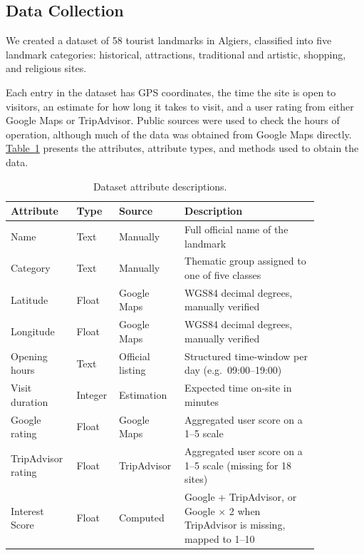 \subsection*{Data Collection}

We created a dataset of 58 tourist landmarks in Algiers, classified into five landmark categories: historical, attractions, traditional and artistic, shopping, and religious sites.

Each entry in the dataset has GPS coordinates, the time the site is open to visitors, an estimate for how long it takes to visit, and a user rating from either Google Maps or TripAdvisor. Public sources were used to check the hours of operation, although much of the data was obtained from Google Maps directly. \hyperref[tab:attributes]{Table~\ref*{tab:attributes}} presents the attributes, attribute types, and methods used to obtain the data.

\begin{table}[htbp]
  \centering
  \caption{Dataset attribute descriptions.}
  \label{tab:attributes}
  \small
  \renewcommand{\arraystretch}{1.15}
  \begin{tabular}{|p{0.18\linewidth}|p{0.10\linewidth}|p{0.17\linewidth}|p{0.41\linewidth}|}
    \hline
    \textbf{Attribute} & \textbf{Type} & \textbf{Source} & \textbf{Description} \\
    \hline
    Name & Text & Manually & Full official name of the landmark \\
    \hline
    Category & Text & Manually & Thematic group assigned to one of five classes \\
    \hline
    Latitude & Float & Google Maps & WGS84 decimal degrees, manually verified \\
    \hline
    Longitude & Float & Google Maps & WGS84 decimal degrees, manually verified \\
    \hline
    Opening hours & Text & Official listing & Structured time-window per day (e.g.\ 09:00--19:00) \\
    \hline
    Visit duration & Integer & Estimation & Expected time on-site in minutes \\
    \hline
    Google rating & Float & Google Maps & Aggregated user score on a 1--5 scale \\
    \hline
    TripAdvisor rating & Float & TripAdvisor & Aggregated user score on a 1--5 scale (missing for 18 sites) \\
    \hline
    Interest Score & Float & Computed & Google + TripAdvisor, or Google $\times$ 2 when TripAdvisor is missing, mapped to 1--10 \\
    \hline
  \end{tabular}
\end{table}

